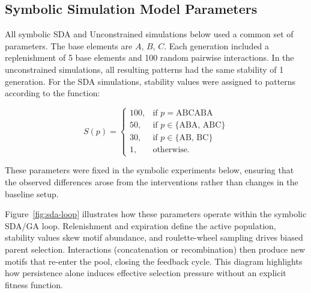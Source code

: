 \documentclass[life,article,submit,pdftex,moreauthors]{Definitions/mdpi}
\begin{document}
\subsection{Symbolic Simulation Model Parameters}

All symbolic SDA and Unconstrained simulations below used a common set of parameters. The base elements are $A$, $B$, $C$.
Each generation included
a replenishment of 5 base elements and 100 random pairwise
interactions. In the unconstrained simulations, all resulting patterns had the same stability of 1 generation. For the SDA simulations, 
stability values were assigned to patterns according to the
function:

\begin{equation}
S(p) =
\begin{cases}
100, & \text{if } p = \text{ABCABA} \\
50, & \text{if } p \in \{\text{ABA, ABC}\} \\
30, & \text{if } p \in \{\text{AB, BC}\} \\
1, & \text{otherwise}.
\end{cases}
\end{equation}

These parameters were fixed in the symbolic experiments below, ensuring that the observed differences arose from the interventions rather than changes in
the baseline setup.

Figure~\ref{fig:sda-loop} illustrates how these parameters operate within the
symbolic SDA/GA loop. Relenishment and expiration define the active population, 
stability values skew motif abundance, and roulette-wheel sampling drives
biased parent selection. Interactions (concatenation or recombination) then
produce new motifs that re-enter the pool, closing the feedback cycle. 
This diagram highlights how persistence alone induces effective selection
pressure without an explicit fitness function.
\end{document}
